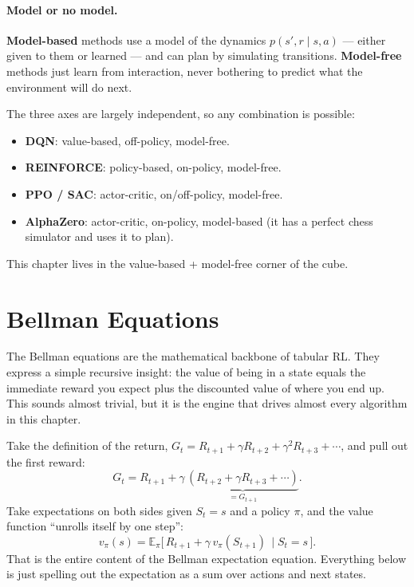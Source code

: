 \documentclass[11pt, oneside]{book}
\newcommand{\E}{\mathbb{E}}              %
\newcommand{\vpi}{v_{\pi}}               %
\begin{document}
\paragraph{Model or no model.}
\textbf{Model-based} methods use a model of the dynamics $p(s', r \mid s, a)$ ---
either given to them or learned --- and can plan by simulating transitions.
\textbf{Model-free} methods just learn from interaction, never bothering to predict
what the environment will do next.

\begin{intbox}[title={Composing the axes}]
The three axes are largely independent, so any combination is possible:
\begin{itemize}
  \item \textbf{DQN}: value-based, off-policy, model-free.
  \item \textbf{REINFORCE}: policy-based, on-policy, model-free.
  \item \textbf{PPO / SAC}: actor-critic, on/off-policy, model-free.
  \item \textbf{AlphaZero}: actor-critic, on-policy, model-based (it has a perfect
    chess simulator and uses it to plan).
\end{itemize}
This chapter lives in the value-based + model-free corner of the cube.
\end{intbox}

\section{Bellman Equations}

The Bellman equations are the mathematical backbone of tabular RL.
They express a simple recursive insight: the value of being in a state equals
the immediate reward you expect plus the discounted value of where you end up.
This sounds almost trivial, but it is the engine that drives almost every algorithm
in this chapter.

\begin{intbox}[title={Where the recursion comes from}]
Take the definition of the return, $G_t = R_{t+1} + \gamma R_{t+2} + \gamma^2 R_{t+3} + \cdots$,
and pull out the first reward:
\[
  G_t = R_{t+1} + \gamma\, \underbrace{(R_{t+2} + \gamma R_{t+3} + \cdots)}_{= G_{t+1}}.
\]
Take expectations on both sides given $S_t = s$ and a policy $\pi$, and the value
function ``unrolls itself by one step'':
\[
  \vpi(s) = \E_\pi\!\bigl[\, R_{t+1} + \gamma\, \vpi(S_{t+1})\, \mid S_t = s\, \bigr].
\]
That is the entire content of the Bellman expectation equation. Everything below
is just spelling out the expectation as a sum over actions and next states.
\end{intbox}
\end{document}
